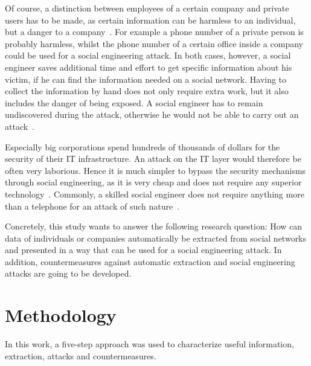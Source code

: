 Of course, a distinction between employees of a certain company and private
users has to be made, as certain information can be harmless to an individual,
but a danger to a company~\cite{mitnick2003}. For example a phone number of a
private person is probably harmless, whilst the phone number of a certain
office inside a company could be used for a social engineering attack. In both
cases, however, a social engineer saves additional time and effort to get
specific information about his victim, if he can find the information needed on
a social network. Having to collect the information by hand does not only
require extra work, but it also includes the danger of being exposed. A social
engineer has to remain undiscovered during the attack, otherwise he would not
be able to carry out an attack~\cite{mitnick2003}.

Especially big corporations spend hundreds of thousands of dollars for the
security of their IT infrastructure. An attack on the IT layer would therefore
be often very laborious. Hence it is much simpler to bypass the security
mechanisms through social engineering, as it is very cheap and does not require
any superior technology~\cite{winkler1995}. Commonly, a skilled social engineer
does not require anything more than a telephone for an attack of such
nature~\cite{mitnick2003}.

Concretely, this study wants to answer the following research question:
How can data of individuals or companies automatically be extracted
from social networks and presented in a way that can be used for a social
engineering attack. In addition, countermeasures against automatic extraction
and social engineering attacks are going to be developed.

\section{Methodology}

In this work, a five-step approach was used to characterize useful information,
extraction, attacks and countermeasures.

